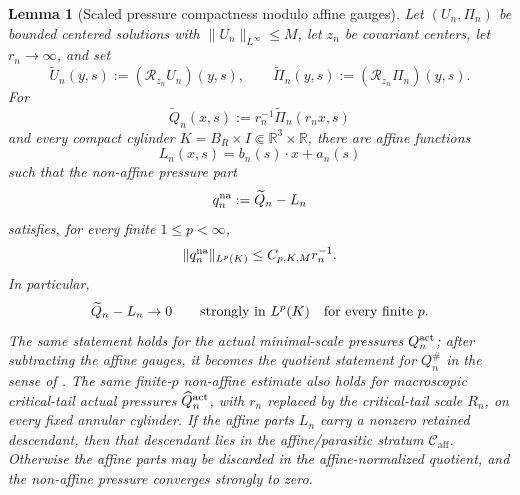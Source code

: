 \documentclass[11pt]{amsart}
\numberwithin{equation}{section}
\theoremstyle{plain}
\newtheorem{lemma}[lemma]{Lemma}
\theoremstyle{definition}
\theoremstyle{remark}
\newcommand{\calR}{\mathcal R}
\newcommand{\Caff}{\mathcal C_{\mathrm{aff}}}
\begin{document}
\begin{lemma}[Scaled pressure compactness modulo affine gauges]
\label{lem:scaled-pressure-compactness-affine}
Let \((U_n,\Pi_n)\) be bounded centered solutions with
\(\|U_n\|_{L^\infty}\le M\), let \(z_n\) be covariant centers, let
\(r_n\to\infty\), and set
\[
   \widetilde U_n(y,s):=(\calR_{z_n}U_n)(y,s),
   \qquad
   \widetilde\Pi_n(y,s):=(\calR_{z_n}\Pi_n)(y,s).
\]
For
\[
   \widetilde Q_n(x,s):=r_n^{-1}\widetilde\Pi_n(r_nx,s)
\]
and every compact cylinder
\(K=B_R\times I\Subset\mathbb R^3\times\mathbb R\), there are affine functions
\[
   L_n(x,s)=b_n(s)\cdot x+a_n(s)
\]
such that the non-affine pressure part
\[
   q_n^{\rm na}:=\widetilde Q_n-L_n
\]
satisfies, for every finite \(1\le p<\infty\),
\begin{equation}\label{eq:scaled-pressure-nonaffine-Lp}
   \|q_n^{\rm na}\|_{L^p(K)}
   \le C_{p,K,M}r_n^{-1} .
\end{equation}
In particular,
\begin{equation}\label{eq:scaled-pressure-compactness-affine}
   \widetilde Q_n-L_n\to0
   \qquad\hbox{strongly in }L^p(K)
   \quad\text{for every finite }p.
\end{equation}
The same statement holds for the actual minimal-scale pressures
\(Q_n^{\rm act}\); after subtracting the affine gauges, it becomes the quotient
statement for \(Q_n^\#\) in the sense of
.  The same finite-\(p\) non-affine
estimate also holds for macroscopic critical-tail actual pressures
\(\widehat Q_n^{\rm act}\), with \(r_n\) replaced by the critical-tail scale
\(R_n\), on every fixed annular cylinder.  If the affine parts
\(L_n\) carry a nonzero retained descendant, then that descendant lies in the
affine/parasitic stratum \(\Caff\).  Otherwise the affine parts may be
discarded in the affine-normalized quotient, and the non-affine pressure
converges strongly to zero.
\end{lemma}
\end{document}

